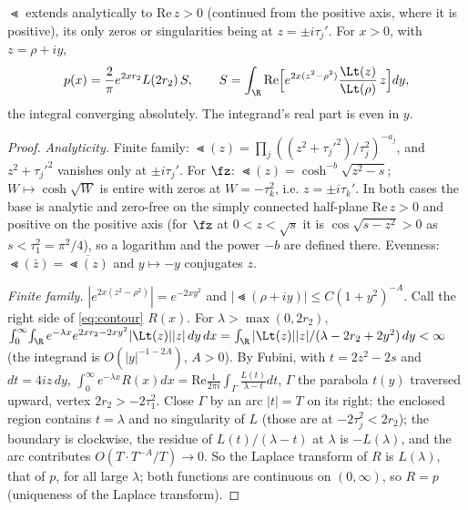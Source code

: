 \begin{lemma}\label{lem:contour}
$\Lt$ extends analytically to $\mathrm{Re}\,z>0$ (continued from the positive axis, where it is positive), its
only zeros or singularities being at $z=\pm i\tau_j'$. For $x>0$, with $z=\rho+iy$,
\begin{equation}\label{eq:contour}
p(x)=\frac2\pi e^{2xr_2}L(2r_2)\,S,\qquad S=\int_\R\mathrm{Re}\Bigl[e^{2x(z^2-\rho^2)}\frac{\Lt(z)}{\Lt(\rho)}\,z
\Bigr]dy,
\end{equation}
the integral converging absolutely. The integrand's real part is even in $y$.
\end{lemma}
\begin{proof}
\emph{Analyticity.} Finite family: $\Lt(z)=\prod_j((z^2+\tau_j'^2)/\tau_j^2)^{-a_j}$, and $z^2+\tau_j'^2$ vanishes
only at $\pm i\tau_j'$. For $\fz$: $\Lt(z)=\cosh^{-b}\sqrt{z^2-s}$; $W\mapsto\cosh\sqrt W$ is entire with zeros at
$W=-\tau_k^2$, i.e. $z=\pm i\tau_k'$. In both cases the base is analytic and zero-free on the simply connected
half-plane $\mathrm{Re}\,z>0$ and positive on the positive axis (for $\fz$ at $0<z<\sqrt s$ it is
$\cos\sqrt{s-z^2}>0$ as $s<\tau_1^2=\pi^2/4$), so a logarithm and the power $-b$ are defined there. Evenness:
$\Lt(\bar z)=\overline{\Lt(z)}$ and $y\mapsto-y$ conjugates $z$.

\emph{Finite family.} $|e^{2x(z^2-\rho^2)}|=e^{-2xy^2}$ and $|\Lt(\rho+iy)|\le C(1+y^2)^{-A}$. Call the right
side of \eqref{eq:contour} $R(x)$. For $\lambda>\max(0,2r_2)$,
$\int_0^\infty\!\int_\R e^{-\lambda x}e^{2xr_2-2xy^2}|\Lt(z)||z|\,dy\,dx=\int_\R|\Lt(z)||z|/(\lambda-2r_2+2y^2)\,dy
<\infty$ (the integrand is $O(|y|^{-1-2A})$, $A>0$). By Fubini, with $t=2z^2-2s$ and $dt=4iz\,dy$,
$\int_0^\infty e^{-\lambda x}R(x)dx=\mathrm{Re}\frac1{2\pi i}\int_\Gamma\frac{L(t)}{\lambda-t}dt$, $\Gamma$ the
parabola $t(y)$ traversed upward, vertex $2r_2>-2\tau_1^2$. Close $\Gamma$ by an arc $|t|=T$ on its right: the
enclosed region contains $t=\lambda$ and no singularity of $L$ (those are at $-2\tau_j^2<2r_2$); the boundary is
clockwise, the residue of $L(t)/(\lambda-t)$ at $\lambda$ is $-L(\lambda)$, and the arc contributes
$O(T\cdot T^{-A}/T)\to0$. So the Laplace transform of $R$ is $L(\lambda)$, that of $p$, for all large
$\lambda$; both functions are continuous on $(0,\infty)$, so $R=p$ (uniqueness of the Laplace transform).


\end{proof}

